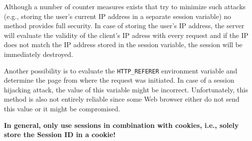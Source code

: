 \documentclass[a4paper, justified, notoc]{tufte-handout} %
\makeatletter
\newenvironment{listing}[1][htbp]
  {\ifvmode\else\unskip\fi\begin{@tufte@float}[#1]{lstlisting}{}}
  {\end{@tufte@float} } %
\makeatother
\begin{document}
Although a number of counter measures exists that try to minimize such attacks (e.g., storing the user's current IP address in a separate session variable) no method provides full security. In case of storing the user's IP address, the server will evaluate the validity of the client's IP adress with every request and if the IP does not match the IP address stored in the session variable, the session will be immediately destroyed. 

Another possibility is to evaluate the \texttt{HTTP\_REFERER} environment variable and determine the page from where the request was initiated. In case of a session hijacking attack, the value of this variable might be incorrect. Unfortunately, this method is also not entirely reliable since some Web browser either do not send this value or it might be compromised.  

\textbf{In general, only use sessions in combination with cookies, i.e., solely store the Session ID in a cookie!}







%






\end{document}
